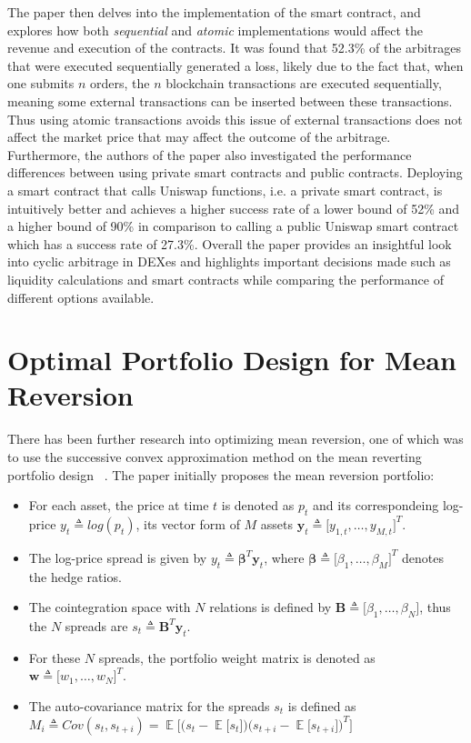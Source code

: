 \noindent The paper then delves into the implementation of the smart contract, and explores how both \textit{sequential} and \textit{atomic} implementations would affect the revenue and execution of the contracts. It was found that 52.3\% of the arbitrages that were executed sequentially generated a loss, likely due to the fact that, when one submits $n$ orders, the $n$ blockchain transactions are executed sequentially, meaning some external transactions can be inserted between these transactions. Thus using atomic transactions avoids this issue of external transactions does not affect the market price that may affect the outcome of the arbitrage.
\\[5mm]
Furthermore, the authors of the paper also investigated the performance differences between using private smart contracts and public contracts. Deploying a smart contract that calls Uniswap functions, i.e. a private smart contract, is intuitively better and achieves a higher success rate of a lower bound of 52\% and a higher bound of 90\% in comparison to calling a public Uniswap smart contract which has a success rate of 27.3\%. Overall the paper provides an insightful look into cyclic arbitrage in DEXes and highlights important decisions made such as liquidity calculations and smart contracts while comparing the performance of different options available.

\section{Optimal Portfolio Design for Mean Reversion}
\label{appendix:add-background-opt-portfolio-des-mean-revers}
There has been further research into optimizing mean reversion, one of which was to use the successive convex approximation method on the mean reverting portfolio design ~\cite{ZipingZhao2019OMPW}. The paper initially proposes the mean reversion portfolio:
\begin{itemize}
    \itemsep0em
    \item For each asset, the price at time $t$ is denoted as $p_t$ and its correspondeing log-price $y_t \triangleq log(p_t)$, its vector form of $M$ assets $\mathbf{y}_t \triangleq \big[ y_{1,t}, \dots ,y_{M,t} \big]^T$.
    \item The log-price spread is given by $y_t \triangleq \mathbf{\beta}^T\mathbf{y}_t$, where $\mathbf{\beta} \triangleq \big[ \beta_1, \dots ,\beta_M \big]^T$ denotes the hedge ratios.
    \item The cointegration space with $N$ relations is defined by $\mathbf{B} \triangleq \big[ \beta_1, \dots ,\beta_N \big]$, thus the $N$ spreads are $s_t \triangleq \mathbf{B}^T\mathbf{y}_t$.
    \item For these $N$ spreads, the portfolio weight matrix is denoted as $\mathbf{w} \triangleq \big[ w_1, \dots ,w_N \big]^T$.
    \item The auto-covariance matrix for the spreads $s_t$ is defined as \\ ${M_i \triangleq Cov(s_t, s_{t+i}) = \mathop{\mathbb{E}} \big[ \big( s_t - \mathop{\mathbb{E}} \big[ s_t \big]\big) \big( s_{t+i} - \mathop{\mathbb{E}} \big[ s_{t+i} \big]\big)^T \big]}$
\end{itemize}

